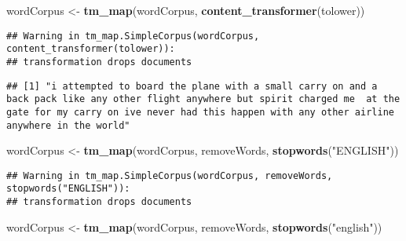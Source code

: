 \documentclass[
]{article}
\newenvironment{Shaded}{\begin{snugshade}}{\end{snugshade}}
\newcommand{\DecValTok}[1]{\textcolor[rgb]{0.00,0.00,0.81}{#1}}
\newcommand{\FunctionTok}[1]{\textcolor[rgb]{0.13,0.29,0.53}{\textbf{#1}}}
\newcommand{\NormalTok}[1]{#1}
\newcommand{\OtherTok}[1]{\textcolor[rgb]{0.56,0.35,0.01}{#1}}
\newcommand{\SpecialCharTok}[1]{\textcolor[rgb]{0.81,0.36,0.00}{\textbf{#1}}}
\newcommand{\StringTok}[1]{\textcolor[rgb]{0.31,0.60,0.02}{#1}}
\begin{document}
\begin{Shaded}
\begin{Highlighting}[]
\NormalTok{wordCorpus }\OtherTok{\textless{}{-}} \FunctionTok{tm\_map}\NormalTok{(wordCorpus, }\FunctionTok{content\_transformer}\NormalTok{(tolower))}
\end{Highlighting}
\end{Shaded}

\begin{verbatim}
## Warning in tm_map.SimpleCorpus(wordCorpus, content_transformer(tolower)):
## transformation drops documents
\end{verbatim}

\begin{Shaded}
\end{Shaded}

\begin{verbatim}
## [1] "i attempted to board the plane with a small carry on and a back pack like any other flight anywhere but spirit charged me  at the gate for my carry on ive never had this happen with any other airline anywhere in the world"
\end{verbatim}

\begin{Shaded}
\begin{Highlighting}[]
\NormalTok{wordCorpus }\OtherTok{\textless{}{-}} \FunctionTok{tm\_map}\NormalTok{(wordCorpus, removeWords, }\FunctionTok{stopwords}\NormalTok{(}\StringTok{"ENGLISH"}\NormalTok{))}
\end{Highlighting}
\end{Shaded}

\begin{verbatim}
## Warning in tm_map.SimpleCorpus(wordCorpus, removeWords, stopwords("ENGLISH")):
## transformation drops documents
\end{verbatim}

\begin{Shaded}
\begin{Highlighting}[]
\NormalTok{wordCorpus }\OtherTok{\textless{}{-}} \FunctionTok{tm\_map}\NormalTok{(wordCorpus, removeWords, }\FunctionTok{stopwords}\NormalTok{(}\StringTok{"english"}\NormalTok{))}
\end{Highlighting}
\end{Shaded}
\end{document}
